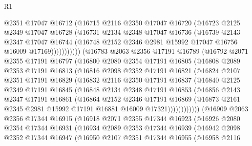 \begin{lexlean}{R1}
\begin{coremodule}
                @2351
                @17047
                @16712
                (@16715
                  @2116
                  @2350
                  @17047
                  @16720
                  (@16723
                    @2125
                    @2349
                    @17047
                    @16728
                    (@16731
                      @2134
                      @2348
                      @17047
                      @16736
                      (@16739
                        @2143
                        @2347
                        @17047
                        @16744
                        (@16748 @2152 @2346 @2981 @15992 @17047 @16756 @16009 @17169)))))))))))
    (@16783
      @2063
      @2356
      @17191
      @16789
      (@16792
        @2071
        @2355
        @17191
        @16797
        (@16800
          @2080
          @2354
          @17191
          @16805
          (@16808
            @2089
            @2353
            @17191
            @16813
            (@16816
              @2098
              @2352
              @17191
              @16821
              (@16824
                @2107
                @2351
                @17191
                @16829
                (@16832
                  @2116
                  @2350
                  @17191
                  @16837
                  (@16840
                    @2125
                    @2349
                    @17191
                    @16845
                    (@16848
                      @2134
                      @2348
                      @17191
                      @16853
                      (@16856
                        @2143
                        @2347
                        @17191
                        @16861
                        (@16864
                          @2152
                          @2346
                          @17191
                          @16869
                          (@16873 @2161 @2345 @2981 @15992 @17191 @16881 @16009 @17321))))))))))))
    (@16909
      @2063
      @2356
      @17344
      @16915
      (@16918
        @2071
        @2355
        @17344
        @16923
        (@16926
          @2080
          @2354
          @17344
          @16931
          (@16934
            @2089
            @2353
            @17344
            @16939
            (@16942
              @2098
              @2352
              @17344
              @16947
              (@16950
                @2107
                @2351
                @17344
                @16955
                (@16958
                  @2116

\end{coremodule}
\end{lexlean}
